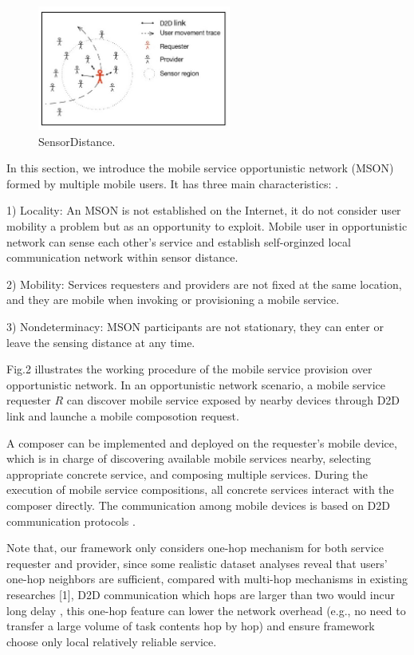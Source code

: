 \documentclass[10pt,journal,compsoc]{IEEEtran}
\begin{document}
\begin{figure}[!t]
\centering
\includegraphics[width=2.5in]{./img/fig2.jpg}
\caption{SensorDistance.}
\label{fig_sim}
\end{figure}

In this section, we introduce the mobile service opportunistic network (MSON) formed by multiple mobile users. It has three main characteristics: \cite{Deng2017}.

1) Locality: An MSON is not established on the Internet, it do not consider user mobility a problem but as an opportunity to exploit. Mobile user in opportunistic network can sense each other's service and establish self-orginzed local communication network within sensor distance.

2) Mobility: Services requesters and providers are not fixed at the same location, and they are mobile when invoking or provisioning a mobile service.

3) Nondeterminacy: MSON participants are not stationary, they can enter or leave the sensing distance at any time. 



Fig.2 illustrates the working procedure of the mobile service provision over opportunistic network. In an opportunistic network scenario, a mobile service requester $R$ can discover mobile service exposed by nearby devices through D2D link and launche a mobile composotion request. 

A composer can be implemented and deployed on the requester’s mobile device, which is in charge of discovering available mobile services nearby, selecting appropriate concrete service, and composing multiple services. During the execution of mobile service compositions, all concrete services interact with the composer directly. The communication among mobile devices is based on D2D communication protocols \cite{Deng2017}.

Note that, our framework only considers one-hop mechanism for both service requester and provider, since some realistic dataset analyses reveal that users’ one-hop neighbors are sufficient, compared with multi-hop mechanisms in existing researches \cite{chang2015progressive,karaliopoulos2015user,han2016competition,tuncay2013participant,wu2013homing,jiang2016exploiting}[1]\cite{liu2013exploring}, D2D communication which hops are larger than two would incur long delay \cite{li2014can},  this one-hop feature can lower the network overhead (e.g., no need to transfer a large volume of task contents hop by hop) and ensure framework choose only local relatively reliable service. 
\end{document}

